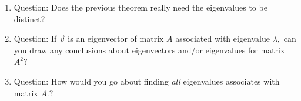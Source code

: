 \documentclass[11pt,fleqn]{article}
\begin{document}
\begin{enumerate}
\item Question: Does the previous theorem really need the eigenvalues to be distinct?\\

\item Question: If $\vec{v}$ is an eigenvector of matrix $A$ associated with eigenvalue $\lambda,$ can you draw any conclusions about eigenvectors and/or eigenvalues for matrix $A^2$?
\vspace{2in}
\item Question: How would you go about finding \emph{all} eigenvalues associates with matrix $A.$?
\vspace{1in}
  \end{enumerate}
  
\end{document}
